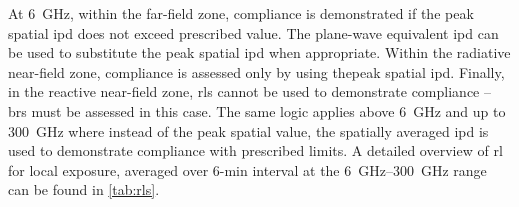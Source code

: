 At \SI{6}{\GHz}, within the far-field zone, compliance is demonstrated if the peak spatial \gls{ipd} does not exceed prescribed value.
The plane-wave equivalent \gls{ipd} can be used to substitute the peak spatial \gls{ipd} when appropriate.
Within the radiative near-field zone, compliance is assessed only by using thepeak spatial \gls{ipd}.
Finally, in the reactive near-field zone, \gls{rl}s cannot be used to demonstrate compliance -- \gls{br}s must be assessed in this case.
The same logic applies above \SI{6}{\GHz} and up to \SI{300}{\GHz} where instead of the peak spatial value, the spatially averaged \gls{ipd} is used to demonstrate compliance with prescribed limits.
A detailed overview of \gls{rl} for local exposure, averaged over 6-min interval at the \SIrange[range-units=single,range-phrase=--]{6}{300}{\GHz} range can be found in \cref{tab:rls}.
\begin{table}[ht]
\begin{center}
\caption{(Exposure) reference levels averaged over 6-min interval at the \SIrange[range-units=single,range-phrase=--]{6}{300}{\GHz} range.}
\label{tab:rls}
\end{center}
\end{table}
